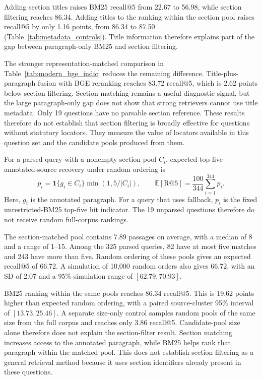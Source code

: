 \documentclass[pdflatex,sn-basic]{sn-jnl}%
\theoremstyle{thmstyleone}%
\theoremstyle{thmstyletwo}%
\theoremstyle{thmstylethree}%
\begin{document}
Adding section titles raises BM25 recall@5 from 22.67 to 56.98, while section
filtering reaches 86.34. Adding titles to the ranking within the section pool
raises recall@5 by only 1.16 points, from 86.34 to 87.50
(Table~\ref{tab:metadata_controls}). Title information therefore explains
part of the gap between paragraph-only BM25 and section filtering.

The stronger representation-matched comparison in
Table~\ref{tab:modern_bge_indic} reduces the remaining difference.
Title-plus-paragraph fusion with BGE reranking reaches 83.72 recall@5, which
is 2.62 points below section filtering. Section matching remains a useful
diagnostic signal, but the large paragraph-only gap does not show that strong
retrievers cannot use title metadata. Only 19 questions have no parsable
section reference. These results therefore do not establish that section
filtering is broadly effective for questions without statutory locators.
They measure the value of locators available in this question set and the
candidate pools produced from them.

For a parsed query with a nonempty section pool \(C_i\), expected top-five
annotated-source recovery under random ordering is
\[
p_i=\mathbf{1}\{g_i\in C_i\}\min(1,5/|C_i|),
\qquad
\mathbb{E}[\mathrm{R@5}]
=\frac{100}{344}\sum_{i=1}^{344}p_i.
\]
Here, \(g_i\) is the annotated paragraph. For a query that uses fallback,
\(p_i\) is the fixed unrestricted-BM25 top-five hit indicator. The 19
unparsed questions therefore do not receive random full-corpus rankings.

The section-matched pool contains 7.89 passages on average, with a median of
8 and a range of 1--15. Among the 325 parsed queries, 82 have at most five
matches and 243 have more than five. Random ordering of these pools gives
an expected recall@5 of 66.72. A simulation of 10,000 random orders also
gives 66.72, with an SD of 2.07 and a 95\% simulation range of
$[62.79,70.93]$.

BM25 ranking within the same pools reaches 86.34 recall@5. This is 19.62
points higher than expected random ordering, with a paired source-cluster
95\% interval of $[13.73,25.46]$. A separate size-only control samples
random pools of the same size from the full corpus and reaches only 3.86
recall@5. Candidate-pool size alone therefore does not explain the
section-filter result. Section matching increases access to the annotated
paragraph, while BM25 helps rank that paragraph within the matched pool.
This does not establish section filtering as a general retrieval method
because it uses section identifiers already present in these questions.
\end{document}
